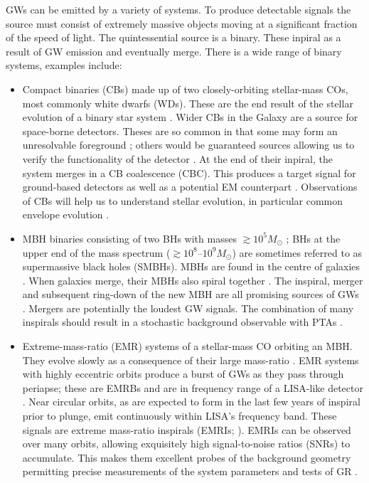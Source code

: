 GWs can be emitted by a variety of systems. To produce detectable signals the source must consist of extremely massive objects moving at a significant fraction of the speed of light. The quintessential source is a binary. These inpiral as a result of GW emission and eventually merge. There is a wide range of binary systems, examples include:
\begin{itemize}
\item Compact binaries (CBs) made up of two closely-orbiting stellar-mass COs, most commonly white dwarfs (WDs). These are the end result of the stellar evolution of a binary star system \citep{Postnov2006}. Wider CBs in the Galaxy are a source for space-borne detectors. Theses are so common in that some may form an unresolvable foreground \citep{Nelemans2009}; others would be guaranteed sources allowing us to verify the functionality of the detector \citep{Stroeer2006}. At the end of their inpiral, the system merges in a CB coalescence (CBC). This produces a target signal for ground-based detectors \citep{Abadie2010a} as well as a potential EM counterpart \citep[e.g.,]{Webbink1984,Iben1984,Metzger2010,Rezzolla2011,Nakar2011}. Observations of CBs will help us to understand stellar evolution, in particular common envelope evolution \citep{Ivanova2013}.

\item MBH binaries consisting of two BHs with masses $\gtrsim 10^5 M_\odot$ \citep{Sesana2013b}; BHs at the upper end of the mass spectrum ($\gtrsim10^8$--$10^9 M_\odot$) are sometimes referred to as supermassive black holes (SMBHs). MBHs are found in the centre of galaxies \citep{Lynden-Bell1969,Ferrarese2005}. When galaxies merge, their MBHs also spiral together \citep{Volonteri2003,Schnittman2013}. The inspiral, merger and subsequent ring-down of the new MBH are all promising sources of GWs \citep{Flanagan1998}. Mergers are potentially the loudest GW signals. The combination of many inspirals should result in a stochastic background observable with PTAs \citep{Sesana2008}.

\item Extreme-mass-ratio (EMR) systems of a stellar-mass CO orbiting an MBH. They evolve slowly as a consequence of their large mass-ratio \citep{Glampedakis2005,Barack2009}. EMR systems with highly eccentric orbits produce a burst of GWs as they pass through periapse; these are EMRBs and are in frequency range of a LISA-like detector \citep{Rubbo2006}. Near circular orbits, as are expected to form in the last few years of inspiral prior to plunge, emit continuously within LISA's frequency band. These signals are extreme mass-ratio inspirals (EMRIs; \citealt{Amaro-Seoane2007}). EMRIs can be observed over many orbits, allowing exquisitely high signal-to-noise ratios (SNRs) to accumulate. This makes them excellent probes of the background geometry permitting precise measurements of the system parameters and tests of GR \citep[e.g.,][]{Babak2010}.
\end{itemize}

